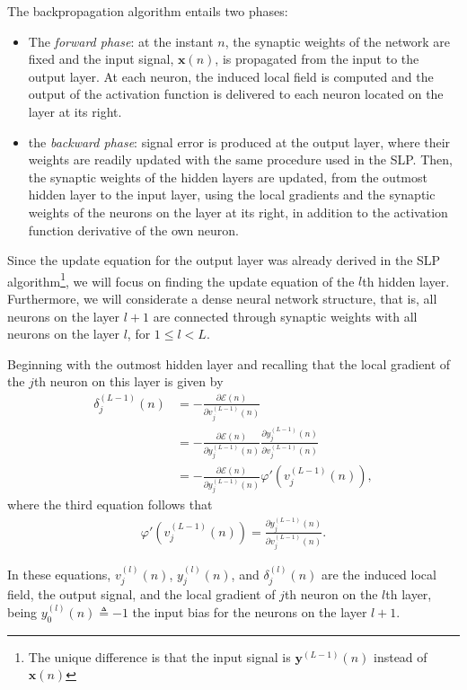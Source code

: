 \documentclass[12pt,a4paper]{article}
\begin{document}
The backpropagation algorithm entails two phases:
\begin{itemize}
    \item The \emph{forward phase}: at the instant \(n\), the synaptic weights of the network are fixed and the input signal, \(\mathbf{x}(n)\), is propagated from the input to the output layer. At each neuron, the induced local field is computed and the output of the activation function is delivered to each neuron located on the layer at its right.
    \item the \emph{backward phase}: signal error is produced at the output layer, where their weights are readily updated with the same procedure used in the SLP. Then, the synaptic weights of the hidden layers are updated, from the outmost hidden layer to the input layer, using the local gradients and the synaptic weights of the neurons on the layer at its right, in addition to the activation function derivative of the own neuron. 
\end{itemize}

Since the update equation for the output layer was already derived in the SLP algorithm\footnote{The unique difference is that the input signal is \(\mathbf{y}^{(L-1)}(n)\) instead of \(\mathbf{x}(n)\)}, we will focus on finding the update equation of the \(l\)th hidden layer. Furthermore, we will considerate a dense neural network structure, that is, all neurons on the layer \(l+1\) are connected through synaptic weights with all neurons on the layer \(l\), for \(1\leq l < L\).

Beginning with the outmost hidden layer and recalling that the local gradient of the \(j\)th neuron on this layer is given by
\begin{align}
    \delta_j^{(L-1)} (n) & = - \frac{\partial \mathscr{E}(n)}{\partial v_{j}^{(L-1)}(n)} \nonumber \\
    & = - \frac{\partial \mathscr{E}(n)}{\partial y_{j}^{(L-1)}(n)} \frac{\partial y_{j}^{(L-1)}(n)}{\partial v_{j}^{(L-1)}(n)} \nonumber \nonumber \\
    & = - \frac{\partial \mathscr{E}(n)}{\partial y_{j}^{(L-1)}(n)} \varphi'(v_j^{(L-1)}(n)),
    \label{eq:local-gradient2}
\end{align}
where the third equation follows that
\begin{align}
    \varphi'(v_j^{(L-1)}(n)) = \frac{\partial y_{j}^{(L-1)}(n)}{\partial v_{j}^{(L-1)}(n)}.
\end{align}

In these equations, \(v_{j}^{(l)}(n)\), \(y_{j}^{(l)} (n)\), and \(\delta_j^{(l)} (n)\) are the induced local field, the output signal, and the local gradient of \(j\)th neuron on the \(l\)th layer, being \(y_{0}^{(l)} (n) \triangleq -1\) the input bias for the neurons on the layer \(l+1\).
\end{document}
